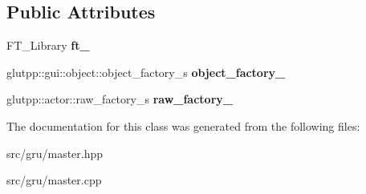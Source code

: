 \subsection*{\-Public \-Attributes}
\begin{DoxyCompactItemize}
\item 
\hypertarget{classglutpp_1_1master_a592c6c858ab83ef126cd00ad2369dea2}{\-F\-T\-\_\-\-Library {\bfseries ft\-\_\-}}\label{classglutpp_1_1master_a592c6c858ab83ef126cd00ad2369dea2}

\item 
\hypertarget{classglutpp_1_1master_a2d4c1404d4ce9241304b4de5040f9ebe}{glutpp\-::gui\-::object\-::object\-\_\-factory\-\_\-s {\bfseries object\-\_\-factory\-\_\-}}\label{classglutpp_1_1master_a2d4c1404d4ce9241304b4de5040f9ebe}

\item 
\hypertarget{classglutpp_1_1master_ae158c0ec4a392a8e34551c7439b37cce}{glutpp\-::actor\-::raw\-\_\-factory\-\_\-s {\bfseries raw\-\_\-factory\-\_\-}}\label{classglutpp_1_1master_ae158c0ec4a392a8e34551c7439b37cce}

\end{DoxyCompactItemize}


\-The documentation for this class was generated from the following files\-:\begin{DoxyCompactItemize}
\item 
src/gru/master.\-hpp\item 
src/gru/master.\-cpp\end{DoxyCompactItemize}
